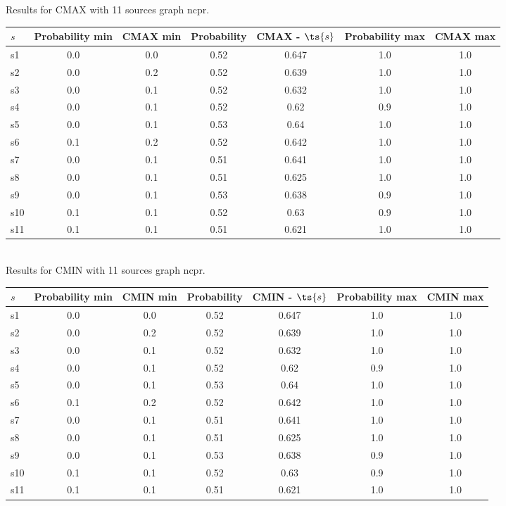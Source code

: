 \documentclass{article}
\begin{document}
\noindent Results for CMAX with 11 sources graph ncpr.

\noindent\begin{tabular}{|l|c|c|c|c|c|c|}
\hline
$s$& Probability min & CMAX min & Probability & CMAX - $\ts{s}$ & Probability max & CMAX max\\
\hline
s1 &0.0 & 0.0 & 0.52 & 0.647 & 1.0 & 1.0\\
\hline
s2 &0.0 & 0.2 & 0.52 & 0.639 & 1.0 & 1.0\\
\hline
s3 &0.0 & 0.1 & 0.52 & 0.632 & 1.0 & 1.0\\
\hline
s4 &0.0 & 0.1 & 0.52 & 0.62 & 0.9 & 1.0\\
\hline
s5 &0.0 & 0.1 & 0.53 & 0.64 & 1.0 & 1.0\\
\hline
s6 &0.1 & 0.2 & 0.52 & 0.642 & 1.0 & 1.0\\
\hline
s7 &0.0 & 0.1 & 0.51 & 0.641 & 1.0 & 1.0\\
\hline
s8 &0.0 & 0.1 & 0.51 & 0.625 & 1.0 & 1.0\\
\hline
s9 &0.0 & 0.1 & 0.53 & 0.638 & 0.9 & 1.0\\
\hline
s10 &0.1 & 0.1 & 0.52 & 0.63 & 0.9 & 1.0\\
\hline
s11 &0.1 & 0.1 & 0.51 & 0.621 & 1.0 & 1.0\\
\hline
\end{tabular}\\

\noindent Results for CMIN with 11 sources graph ncpr.

\noindent\begin{tabular}{|l|c|c|c|c|c|c|}
\hline
$s$& Probability min & CMIN min & Probability & CMIN - $\ts{s}$ & Probability max & CMIN max\\
\hline
s1 &0.0 & 0.0 & 0.52 & 0.647 & 1.0 & 1.0\\
\hline
s2 &0.0 & 0.2 & 0.52 & 0.639 & 1.0 & 1.0\\
\hline
s3 &0.0 & 0.1 & 0.52 & 0.632 & 1.0 & 1.0\\
\hline
s4 &0.0 & 0.1 & 0.52 & 0.62 & 0.9 & 1.0\\
\hline
s5 &0.0 & 0.1 & 0.53 & 0.64 & 1.0 & 1.0\\
\hline
s6 &0.1 & 0.2 & 0.52 & 0.642 & 1.0 & 1.0\\
\hline
s7 &0.0 & 0.1 & 0.51 & 0.641 & 1.0 & 1.0\\
\hline
s8 &0.0 & 0.1 & 0.51 & 0.625 & 1.0 & 1.0\\
\hline
s9 &0.0 & 0.1 & 0.53 & 0.638 & 0.9 & 1.0\\
\hline
s10 &0.1 & 0.1 & 0.52 & 0.63 & 0.9 & 1.0\\
\hline
s11 &0.1 & 0.1 & 0.51 & 0.621 & 1.0 & 1.0\\
\hline
\end{tabular}\\
\end{document}
